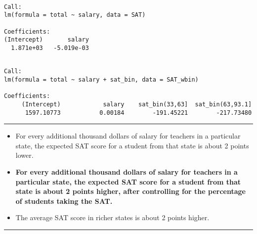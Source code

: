 \documentclass[
]{book}
\newenvironment{Shaded}{\begin{snugshade}}{\end{snugshade}}
\newcommand{\DataTypeTok}[1]{\textcolor[rgb]{0.13,0.29,0.53}{#1}}
\newcommand{\DecValTok}[1]{\textcolor[rgb]{0.00,0.00,0.81}{#1}}
\newcommand{\KeywordTok}[1]{\textcolor[rgb]{0.13,0.29,0.53}{\textbf{#1}}}
\newcommand{\NormalTok}[1]{#1}
\newcommand{\OperatorTok}[1]{\textcolor[rgb]{0.81,0.36,0.00}{\textbf{#1}}}
\newcommand{\StringTok}[1]{\textcolor[rgb]{0.31,0.60,0.02}{#1}}
\begin{document}
\begin{verbatim}

Call:
lm(formula = total ~ salary, data = SAT)

Coefficients:
(Intercept)       salary  
  1.871e+03   -5.019e-03  
\end{verbatim}

\begin{Shaded}
\end{Shaded}

\begin{verbatim}

Call:
lm(formula = total ~ salary + sat_bin, data = SAT_wbin)

Coefficients:
     (Intercept)            salary    sat_bin(33,63]  sat_bin(63,93.1]  
      1597.10773           0.00184        -191.45221        -217.73480  
\end{verbatim}

\begin{center}\rule{0.5\linewidth}{0.5pt}\end{center}

\begin{itemize}
\item
  For every additional thousand dollars of salary for teachers in a particular state, the expected SAT score for a student from that state is about 2 points lower.
\item
  \textbf{For every additional thousand dollars of salary for teachers in a particular state, the expected SAT score for a student from that state is about 2 points higher, after controlling for the percentage of students taking the SAT.}
\item
  The average SAT score in richer states is about 2 points higher.
\end{itemize}

\begin{center}\rule{0.5\linewidth}{0.5pt}\end{center}
\end{document}
